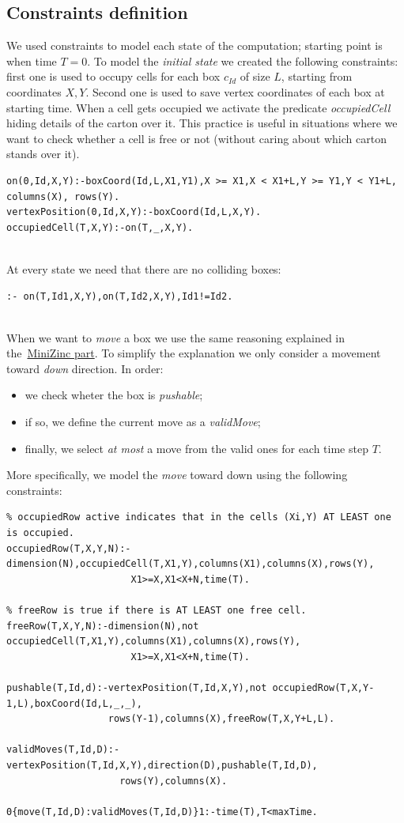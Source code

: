 \documentclass[headinclude, footinclude, abstract=on]{scrarticle}
\begin{document}
\subsection{Constraints definition}
We used constraints to model each state of the computation; starting point is when time $T = 0$. To model the \textit{initial state} we created the following constraints: first one is used to occupy cells for each box $c_{Id}$ of size $L$, starting from coordinates $X,Y$. Second one is used to save vertex coordinates of each box at starting time. When a cell gets occupied we activate the predicate \textit{occupiedCell} hiding details of the carton over it. This practice is useful in situations where we want to check whether a cell is free or not (without caring about which carton stands over it).
\begin{verbatim}
on(0,Id,X,Y):-boxCoord(Id,L,X1,Y1),X >= X1,X < X1+L,Y >= Y1,Y < Y1+L, columns(X), rows(Y).    
vertexPosition(0,Id,X,Y):-boxCoord(Id,L,X,Y). 
occupiedCell(T,X,Y):-on(T,_,X,Y).
\end{verbatim}
\\
At every state we need that there are no colliding boxes:
\begin{verbatim}
:- on(T,Id1,X,Y),on(T,Id2,X,Y),Id1!=Id2.
\end{verbatim}
\\
When we want to \textit{move} a box we use the same reasoning explained in the~\hyperref[sec:pushable]{MiniZinc part}. To simplify the explanation we only consider a movement toward \textit{down} direction. In order:
\begin{itemize}
    \item we check wheter the box is \textit{pushable};
    \item if so, we define the current move as a \textit{validMove};
    \item finally, we select \textit{at most} a move from the valid ones for each time step $T$.
\end{itemize}
More specifically, we model the \textit{move} toward down using the following constraints:
\begin{verbatim}
% occupiedRow active indicates that in the cells (Xi,Y) AT LEAST one is occupied.
occupiedRow(T,X,Y,N):-dimension(N),occupiedCell(T,X1,Y),columns(X1),columns(X),rows(Y),
                      X1>=X,X1<X+N,time(T).
                      
% freeRow is true if there is AT LEAST one free cell.
freeRow(T,X,Y,N):-dimension(N),not occupiedCell(T,X1,Y),columns(X1),columns(X),rows(Y),
                      X1>=X,X1<X+N,time(T).

pushable(T,Id,d):-vertexPosition(T,Id,X,Y),not occupiedRow(T,X,Y-1,L),boxCoord(Id,L,_,_),
                  rows(Y-1),columns(X),freeRow(T,X,Y+L,L).

validMoves(T,Id,D):-vertexPosition(T,Id,X,Y),direction(D),pushable(T,Id,D),
                    rows(Y),columns(X).

0{move(T,Id,D):validMoves(T,Id,D)}1:-time(T),T<maxTime.
\end{verbatim}
\end{document}
